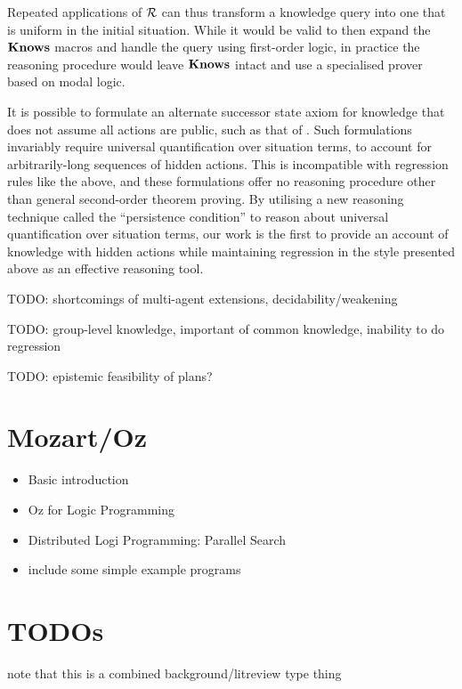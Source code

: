 Repeated applications of $\mathcal{R}$ can thus transform a knowledge query
into one that is uniform in the initial situation. While it would
be valid to then expand the $\mathbf{Knows}$ macros and handle the query
using first-order logic, in practice the reasoning procedure would
leave $\mathbf{Knows}$ intact and use a specialised prover based on modal
logic.

It is possible to formulate an alternate successor state axiom for
knowledge that does not assume all actions are public, such as that
of \citet{Lesperance99sitcalc_approach}. Such formulations invariably
require universal quantification over situation terms, to account
for arbitrarily-long sequences of hidden actions. This is incompatible
with regression rules like the above, and these formulations offer
no reasoning procedure other than general second-order theorem proving.
By utilising a new reasoning technique called the {}``persistence
condition'' to reason about universal quantification over situation
terms, our work is the first to provide an account of knowledge with
hidden actions while maintaining regression in the style presented
above as an effective reasoning tool.

TODO: shortcomings of multi-agent extensions, decidability/weakening
\citet{demolombe00tractable_sc_belief} \citet{petrick02knowledge_equivalence}

TODO: group-level knowledge, important of common knowledge, inability
to do regression

TODO: epistemic feasibility of plans? \citet{giacomo04sem_delib_indigolog,Lesperance01epi_feas_casl}


\section{Mozart/Oz\label{sec:Background:Mozart/Oz}}

\begin{itemize}
\item Basic introduction \citet{vanroy99mozart} 
\item Oz for Logic Programming \citet{vanroy03mozart_logic} 
\item Distributed Logi Programming: Parallel Search \citet{schulte00oz_parallel} 
\item include some simple example programs 
\end{itemize}

\section{TODOs}

note that this is a combined background/litreview type thing

